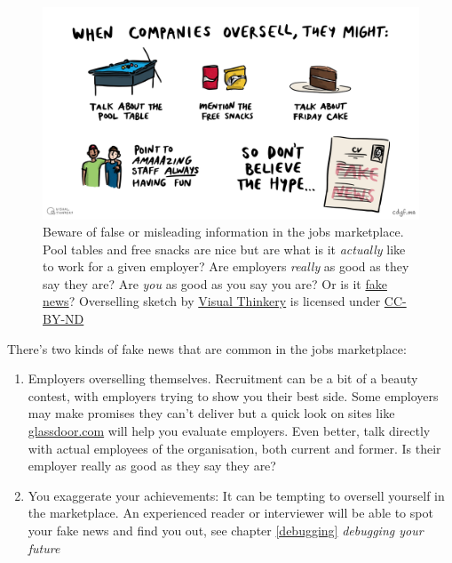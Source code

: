 \documentclass[
]{book}
\providecommand{\tightlist}{%
  \setlength{\itemsep}{0pt}\setlength{\parskip}{0pt}}
\begin{document}
\begin{figure}

{\centering \includegraphics[width=0.98\linewidth]{images/overselling} 

}

\caption{Beware of false or misleading information in the jobs marketplace. Pool tables and free snacks are nice but are what is it \emph{actually} like to work for a given employer? Are employers \emph{really} as good as they say they are? Are \emph{you} as good as you say you are? Or is it \href{https://en.wikipedia.org/wiki/Fake_news}{fake news}? Overselling sketch by \href{https://visualthinkery.com/}{Visual Thinkery} is licensed under \href{https://creativecommons.org/licenses/by-nd/4.0/}{CC-BY-ND}}\label{fig:fakenews-fig}
\end{figure}



There's two kinds of fake news that are common in the jobs marketplace:

\begin{enumerate}
\def\labelenumi{\arabic{enumi}.}
\tightlist
\item
  Employers overselling themselves. Recruitment can be a bit of a beauty contest, with employers trying to show you their best side. Some employers may make promises they can't deliver but a quick look on sites like \href{https://www.glassdoor.com}{glassdoor.com} will help you evaluate employers. Even better, talk directly with actual employees of the organisation, both current and former. Is their employer really as good as they say they are?
\item
  You exaggerate your achievements: It can be tempting to oversell yourself in the marketplace. An experienced reader or interviewer will be able to spot your fake news and find you out, see chapter \ref{debugging} \emph{debugging your future}
\end{enumerate}
\end{document}
